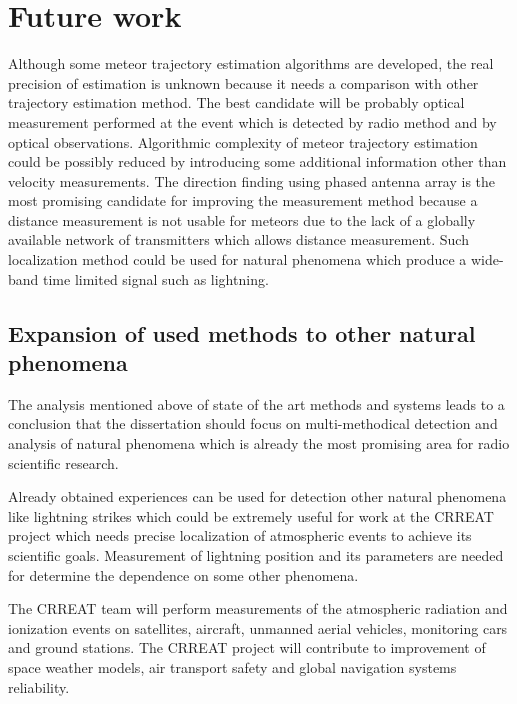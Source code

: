 \documentclass[twoside]{ctuthesis}
\theoremstyle{plain}
\theoremstyle{definition}
\theoremstyle{note}
\begin{document}
\chapter{Future work}

Although some meteor trajectory estimation algorithms are developed, the real precision of estimation is unknown because it needs a comparison with other trajectory estimation method. The best candidate will be probably optical measurement performed at the event which is detected by radio method and by optical observations. 
Algorithmic complexity of meteor trajectory estimation could be possibly reduced by introducing some additional information other than velocity measurements.  The direction finding using phased antenna array is the most promising candidate for improving the measurement method because a distance measurement is not usable for meteors due to the lack of a globally available network of transmitters which allows distance measurement.  Such localization method could be used for natural phenomena which produce a wide-band time limited signal such as lightning.

\section{Expansion of used methods to other natural phenomena}

The analysis mentioned above of state of the art methods and systems leads to a conclusion that the dissertation should focus on multi-methodical detection and analysis of natural phenomena which is already the most promising area for radio scientific research. 

Already obtained experiences can be used for detection other natural phenomena like lightning strikes which could be extremely useful for work at the CRREAT project which needs precise localization of atmospheric events to achieve its scientific goals. Measurement of lightning position and its parameters are needed for determine the dependence on some other phenomena.  

The CRREAT team will perform measurements of the atmospheric radiation and ionization events on satellites, aircraft, unmanned aerial vehicles, monitoring cars and ground stations. The CRREAT project will contribute to improvement of space weather models, air transport safety and global navigation systems reliability.

\appendix

\printindex

\appendix
\end{document}
